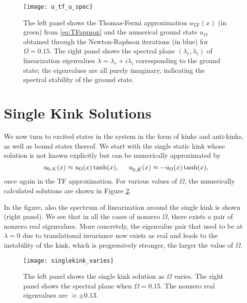 \documentclass[vecphys]{svmult}		%
\begin{document}
\begin{figure}
	\centering
		\texttt{[image: u\_tf\_u\_spec]}
	\caption{ The left panel shows the Thomas-Fermi approximation $u_{\text{TF}}(x)$ (in green) from \eqref{eq:TFapprox} and the
        numerical
        ground state $u_{\Omega}$ obtained through the Newton-Raphson
        iterations (in blue) for $\Omega=0.15$. The right panel shows the
        spectral plane $(\lambda_r,\lambda_i)$ of linearization
        eigenvalues $\lambda=\lambda_r+i \lambda_i$
        corresponding to the ground state; the eigenvalues are all purely imaginary, indicating the spectral stability of the ground state.} 
	\label{u_omega}
\end{figure}

\section{Single Kink Solutions}
We now turn to excited states in the system in the form of kinks
and anti-kinks, as well as bound states thereof.
We start with the single static kink whose solution is
not known explicitly but can be numerically approximated by 
\begin{equation}u_{0,K} (x) \approx  u_{\Omega}(x) \tanh (x), \hspace{0.5cm} u_{0,\tilde{K}} (x) \approx  -u_{\Omega}(x) \tanh (x),
\label{static_kink}
\end{equation}
once again in the TF approximation.
For various values of $\Omega$, the numerically calculated solutions are shown in Figure \ref{singkink}.

In the figure, also the spectrum of linearization around the single kink
is shown (right panel). We see that in all the cases of
 nonzero $\Omega$, there exists a pair of nonzero real eigenvalues.
More concretely, the eigenvalue pair that used to be at $\lambda=0$
due to translational invariance now exists as real and leads to the
instability of the kink, which is progressively stronger,
the larger the value of $\Omega$.



  \begin{figure}[!ht]
 \begin{center}
	\texttt{[image: singlekink\_varies]}
	\caption{ The left panel shows the single kink solution as $\Omega$ varies. The right panel shows the spectral plane when $\Omega=0.15$. The nonzero
        real eigenvalues are $\approx \pm 0.13$. }
	\label{singkink}
	\end{center}
\end{figure}
\end{document}

